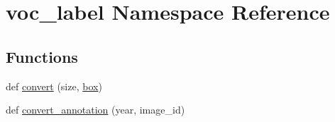 \hypertarget{namespacevoc__label}{}\section{voc\+\_\+label Namespace Reference}
\label{namespacevoc__label}
\subsection*{Functions}
\begin{DoxyCompactItemize}
\item 
def \mbox{\hyperlink{namespacevoc__label_a6acb30b6d6bbb5769eac3381abeab0aa}{convert}} (size, \mbox{\hyperlink{structbox}{box}})
\item 
def \mbox{\hyperlink{namespacevoc__label_a88b8266c71d2efb8bcdbb3a033f210e6}{convert\+\_\+annotation}} (year, image\+\_\+id)
\end{DoxyCompactItemize}
